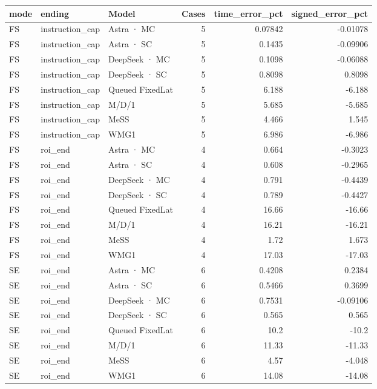 \begin{tabular}{lllrrr}
\toprule
mode & ending & Model & Cases & time\_error\_pct & signed\_error\_pct \\
\midrule
FS & instruction\_cap & Astra · MC & 5 & 0.07842 & -0.01078 \\
FS & instruction\_cap & Astra · SC & 5 & 0.1435 & -0.09906 \\
FS & instruction\_cap & DeepSeek · MC & 5 & 0.1098 & -0.06088 \\
FS & instruction\_cap & DeepSeek · SC & 5 & 0.8098 & 0.8098 \\
FS & instruction\_cap & Queued FixedLat & 5 & 6.188 & -6.188 \\
FS & instruction\_cap & M/D/1 & 5 & 5.685 & -5.685 \\
FS & instruction\_cap & MeSS & 5 & 4.466 & 1.545 \\
FS & instruction\_cap & WMG1 & 5 & 6.986 & -6.986 \\
FS & roi\_end & Astra · MC & 4 & 0.664 & -0.3023 \\
FS & roi\_end & Astra · SC & 4 & 0.608 & -0.2965 \\
FS & roi\_end & DeepSeek · MC & 4 & 0.791 & -0.4439 \\
FS & roi\_end & DeepSeek · SC & 4 & 0.789 & -0.4427 \\
FS & roi\_end & Queued FixedLat & 4 & 16.66 & -16.66 \\
FS & roi\_end & M/D/1 & 4 & 16.21 & -16.21 \\
FS & roi\_end & MeSS & 4 & 1.72 & 1.673 \\
FS & roi\_end & WMG1 & 4 & 17.03 & -17.03 \\
SE & roi\_end & Astra · MC & 6 & 0.4208 & 0.2384 \\
SE & roi\_end & Astra · SC & 6 & 0.5466 & 0.3699 \\
SE & roi\_end & DeepSeek · MC & 6 & 0.7531 & -0.09106 \\
SE & roi\_end & DeepSeek · SC & 6 & 0.565 & 0.565 \\
SE & roi\_end & Queued FixedLat & 6 & 10.2 & -10.2 \\
SE & roi\_end & M/D/1 & 6 & 11.33 & -11.33 \\
SE & roi\_end & MeSS & 6 & 4.57 & -4.048 \\
SE & roi\_end & WMG1 & 6 & 14.08 & -14.08 \\
\bottomrule
\end{tabular}
